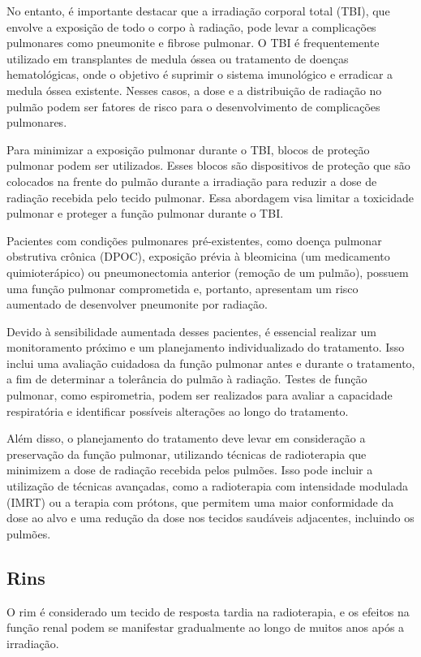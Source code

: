 \documentclass[11pt,a4paper]{article}
\begin{document}
	No entanto, é importante destacar que a irradiação corporal total (TBI), que envolve a exposição de todo o corpo à radiação, pode levar a complicações pulmonares como pneumonite e fibrose pulmonar. O TBI é frequentemente utilizado em transplantes de medula óssea ou tratamento de doenças hematológicas, onde o objetivo é suprimir o sistema imunológico e erradicar a medula óssea existente. Nesses casos, a dose e a distribuição de radiação no pulmão podem ser fatores de risco para o desenvolvimento de complicações pulmonares.

	Para minimizar a exposição pulmonar durante o TBI, blocos de proteção pulmonar podem ser utilizados. Esses blocos são dispositivos de proteção que são colocados na frente do pulmão durante a irradiação para reduzir a dose de radiação recebida pelo tecido pulmonar. Essa abordagem visa limitar a toxicidade pulmonar e proteger a função pulmonar durante o TBI.

	Pacientes com condições pulmonares pré-existentes, como doença pulmonar obstrutiva crônica (DPOC), exposição prévia à bleomicina (um medicamento quimioterápico) ou pneumonectomia anterior (remoção de um pulmão), possuem uma função pulmonar comprometida e, portanto, apresentam um risco aumentado de desenvolver pneumonite por radiação.

	Devido à sensibilidade aumentada desses pacientes, é essencial realizar um monitoramento próximo e um planejamento individualizado do tratamento. Isso inclui uma avaliação cuidadosa da função pulmonar antes e durante o tratamento, a fim de determinar a tolerância do pulmão à radiação. Testes de função pulmonar, como espirometria, podem ser realizados para avaliar a capacidade respiratória e identificar possíveis alterações ao longo do tratamento.

	Além disso, o planejamento do tratamento deve levar em consideração a preservação da função pulmonar, utilizando técnicas de radioterapia que minimizem a dose de radiação recebida pelos pulmões. Isso pode incluir a utilização de técnicas avançadas, como a radioterapia com intensidade modulada (IMRT) ou a terapia com prótons, que permitem uma maior conformidade da dose ao alvo e uma redução da dose nos tecidos saudáveis adjacentes, incluindo os pulmões.

\subsection*{Rins}

	O rim é considerado um tecido de resposta tardia na radioterapia, e os efeitos na função renal podem se manifestar gradualmente ao longo de muitos anos após a irradiação.
\end{document}
